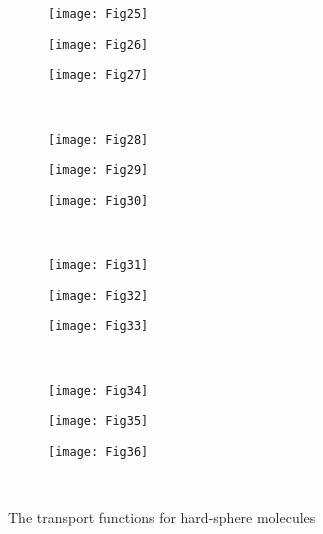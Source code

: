 \documentclass[]{jfm}
\begin{document}
\begin{figure}
    \centering
    \begin{subfigure}[b]{0.33\textwidth}
        \texttt{[image: Fig25]}
        \label{fig:B}
    \end{subfigure}%
    \begin{subfigure}[b]{0.33\textwidth}
        \texttt{[image: Fig26]}
        \label{fig:B_4}
    \end{subfigure}%
    \begin{subfigure}[b]{0.33\textwidth}
        \texttt{[image: Fig27]}
        \label{fig:T1_1}
    \end{subfigure}\\[-6pt]
    \begin{subfigure}[b]{0.33\textwidth}
        \texttt{[image: Fig28]}
        \label{fig:T1_2}
    \end{subfigure}%
    \begin{subfigure}[b]{0.33\textwidth}
        \texttt{[image: Fig29]}
        \label{fig:T2_1}
    \end{subfigure}%
    \begin{subfigure}[b]{0.33\textwidth}
        \texttt{[image: Fig30]}
        \label{fig:T2_2}
    \end{subfigure}\\[-6pt]
    \begin{subfigure}[b]{0.33\textwidth}
        \texttt{[image: Fig31]}
        \label{fig:TT12}
    \end{subfigure}%
    \begin{subfigure}[b]{0.33\textwidth}
        \texttt{[image: Fig32]}
        \label{fig:TT2}
    \end{subfigure}%
    \begin{subfigure}[b]{0.33\textwidth}
        \texttt{[image: Fig33]}
        \label{fig:Q2}
    \end{subfigure}\\[-6pt]
    \begin{subfigure}[b]{0.33\textwidth}
        \texttt{[image: Fig34]}
        \label{fig:Q3}
    \end{subfigure}%
    \begin{subfigure}[b]{0.33\textwidth}
        \texttt{[image: Fig35]}
        \label{fig:QQ22}
    \end{subfigure}%
    \begin{subfigure}[b]{0.33\textwidth}
        \texttt{[image: Fig36]}
        \label{fig:QQ3}
    \end{subfigure}\\[-6pt]
    \caption{The transport functions for hard-sphere molecules}
    \label{fig:transport_functions}
\end{figure}



\end{document}

